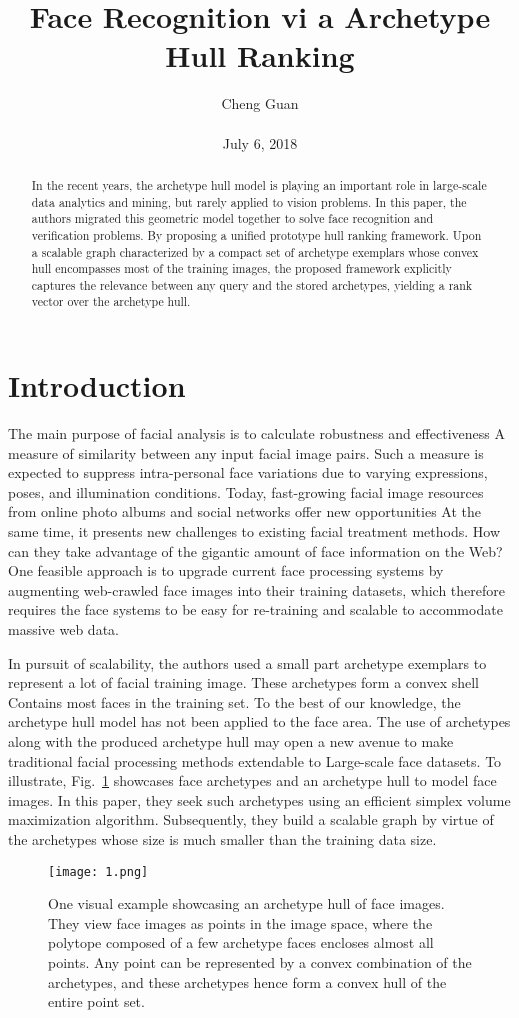 \documentclass[10pt,twocolumn,letterpaper]{article}
\title{Face Recognition vi a Archetype Hull Ranking}
\author{Cheng Guan\\\\
July 6, 2018}
\begin{document}
\maketitle
\begin{abstract}
In the recent years, the archetype hull model is playing an important role in
large-scale data analytics and mining, but rarely applied to
vision problems. In this paper, the authors migrated this geometric model together to solve face recognition and verification problems.
By proposing a unified prototype hull ranking framework.
Upon a scalable graph characterized by a compact
set of archetype exemplars whose convex hull encompasses
most of the training images, the proposed framework explicitly
captures the relevance between any query and the
stored archetypes, yielding a rank vector over the archetype
hull.
\end{abstract}
\section{Introduction}
The main purpose of facial analysis is to calculate robustness and effectiveness
A measure of similarity between any input facial image pairs. Such a measure is
expected to suppress intra-personal face variations due to varying expressions,
poses, and illumination conditions. Today, fast-growing facial image resources from online photo albums and social networks offer new opportunities
At the same time, it presents new challenges to existing facial treatment methods. How can they take advantage of the
gigantic amount of face information on the Web? One feasible
approach is to upgrade current face processing systems
by augmenting web-crawled face images into their training
datasets, which therefore requires the face systems to be
easy for re-training and scalable to accommodate massive
web data. 
\par
In pursuit of scalability, the authors used a small part
archetype exemplars to represent a lot of facial training
image. These archetypes form a convex shell
Contains most faces in the training set. To the best of
our knowledge, the archetype hull model has not been applied
to the face area. 
The use of archetypes along with
the produced archetype hull may open a new avenue to
make traditional facial processing methods extendable to
Large-scale face datasets. To illustrate, Fig.~\ref{fig1} showcases face
archetypes and an archetype hull to model face images. In
this paper, they seek such archetypes using an efficient simplex
volume maximization algorithm. Subsequently, they
build a scalable graph by virtue of the archetypes whose
size is much smaller than the training data size.
\begin{figure}
  \centering
  \texttt{[image: 1.png]}\\
  \caption{One visual example showcasing an archetype hull of face
images. They view face images as points in the image space, where
the polytope composed of a few archetype faces encloses almost
all points. Any point can be represented by a convex combination
of the archetypes, and these archetypes hence form a convex hull
of the entire point set.}\label{fig1}
\end{figure}
\end{document}
